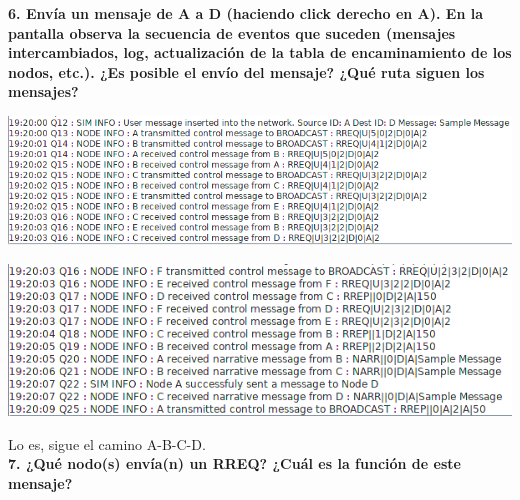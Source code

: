 \documentclass{article}
\begin{document}
\textbf{6. Envía un mensaje de A a D (haciendo click derecho en A). En la pantalla observa la
secuencia de eventos que suceden (mensajes intercambiados, log, actualización de la
tabla de encaminamiento de los nodos, etc.). ¿Es posible el envío del mensaje? ¿Qué
ruta siguen los mensajes?}

\begin{center}
\includegraphics[scale=0.5]{log1.png}
\end{center}

\begin{center}
\includegraphics[scale=0.5]{log2.png}
\end{center}

Lo es, sigue el camino A-B-C-D.\\
                                                                                                                                                                                                                                                                                                                                                                                                                                                                                                                                                                                                                                                    
\textbf{7. ¿Qué nodo(s) envía(n) un RREQ? ¿Cuál es la función de este mensaje?}                                                                                                                                                                                                                                                                                                                                                                                                                                                                                                                                                                                                                                                    
\end{document}

